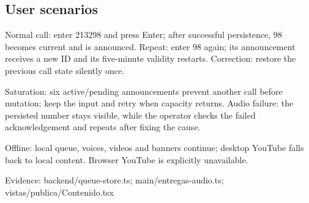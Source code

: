 \subsection{User scenarios}

Normal call: enter 213298 and press Enter; after successful persistence, 98 becomes current and is announced. Repeat: enter 98 again; its announcement receives a new ID and its five-minute validity restarts. Correction: restore the previous call state silently once.

Saturation: six active/pending announcements prevent another call before mutation; keep the input and retry when capacity returns. Audio failure: the persisted number stays visible, while the operator checks the failed acknowledgement and repeats after fixing the cause.

Offline: local queue, voices, videos and banners continue; desktop YouTube falls back to local content. Browser YouTube is explicitly unavailable.

Evidence: backend/queue-store.ts; main/entregas-audio.ts; vistas/publica/Contenido.tsx
